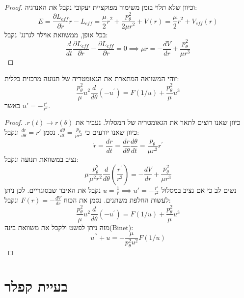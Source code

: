 \documentclass{tstextbook}
\begin{document}
\begin{proof}
וכיוון שלא תלוי בזמן משימור מפוקציית יעקובי נקבל את האנרגיה:
$$ E=\frac{\partial L_{eff}}{\partial\dot{r}}\dot{r}-L_{eff}=\frac{\mu}{2}\dot{r}^2+\frac{p_\theta^2}{2\mu r^2}+V(r)=\boxed{ \frac{\mu}{2}\dot{r}^2+V_{eff}(r) }$$
בכל אופן, ממשוואת אוילר לגרנג' נקבל:
$$ \frac d{dt}\frac{\partial L_{eff}}{\partial\dot{r}}-\frac{\partial L_{eff}}{\partial r}=0\implies \boxed{ \mu\ddot{r}=-\frac{dV}{dr}+\frac{p_\theta^2}{\mu r^3} }$$

\end{proof}
\begin{proposition}
זוהי המשוואה המתארת את הגאומטריה של תנועה מרכזית כללית:
$$ \frac{p_\theta^2}\mu u^2\frac d{d\theta}(-u^{\prime})=F(1/u)+\frac{p_\theta^2}\mu u^3$$
כאשר \(u'=-\frac{r'}{r^{2}}\).

\end{proposition}
\begin{proof}
כיוון שאנו רוצים לתאר את הגאומטריה של המסלול. נעביר את \(r(t)\to r\left( \theta \right)\).
כיוון שאנו יודעים כי \(\frac{d\theta}{dt}=\frac{p_{\theta}}{\mu r^2}\). נסמן \(\frac{dr}{d\theta}=r'\) ונקבל:
$$ \dot{r}=\frac{dr}{dt}=\frac{dr}{d\theta}\frac{d\theta}{dt}=\frac{p_\theta}{\mu r^2}r^{\prime}$$
נציב במשוואת תנועה ונקבל:
$$ \mu\frac{p_\theta^2}{\mu^2r^2}\frac d{d\theta}\left(\frac{r^{\prime}}{r^2}\right)=-\frac{dV}{dr}+\frac{p_\theta^2}{\mu r^3}$$
נשים לב כי אם נציב במסלול \(u=\frac{1}{r}\implies u'=-\frac{r'}{r^2}\) נקבל את האיבר שבסוגריים. לכן ניתן לעשות החלפת משתנים. נסמן את הכוח \(F(r)= -\frac{dV}{dr}\) ונקבל:
$$ \frac{p_\theta^2}\mu u^2\frac d{d\theta}(-u^{\prime})=F(1/u)+\frac{p_\theta^2}\mu u^3$$
מזה ניתן לפשט ולקבל את משוואת בינה(Binet):
$$\boxed{ u^{\prime\prime}+u=-\frac\mu{p_\theta^2u^2}F(1/u)}
$$

\end{proof}
\section{בעיית קפלר}
\end{document}
